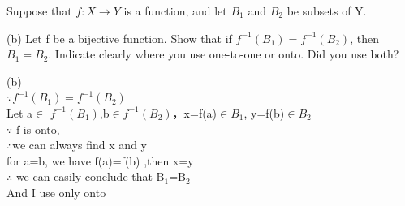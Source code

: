 \documentclass[11pt, a4paper, UTF8]{ctexart}
\begin{document}
\begin{problem}[UD:16.21]
Suppose that \(f: X \rightarrow Y\) is a function, and let \(B_{1}\) and \(B_{2}\) be subsets of Y.

(b) Let f be a bijective function. Show that if \(f^{-1}(B_{1}) = f^{-1}(B_{2})\), then \(B_{1} = B_{2}\). Indicate clearly where you use one-to-one or onto. Did you use both?
\end{problem}
\begin{revision}
(b)\\ 
$\because$$f^{-1}(B_1)=f^{-1}(B_2)$\\
Let a$\in$ $f^{-1}(B_1)$,b$\in$$f^{-1}(B_2)$，x=f(a)$\in B_1$, y=f(b)$\in B_2$\\
$\because$ f is onto, \\
$\therefore$we can always find x and y\\
for a=b, we have f(a)=f(b) ,then x=y\\
$\therefore$ we can easily conclude that B$_1$=B$_2$\\
And I use only onto\\
\end{revision}
\end{document}
